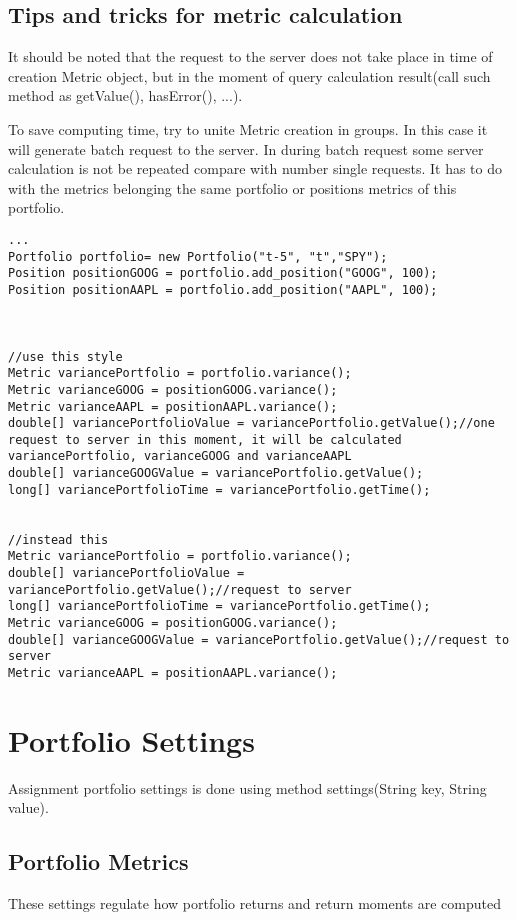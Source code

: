\documentclass[letterpaper]{report}
\begin{document}
\section{Tips and tricks for metric calculation }
It should be noted that the request to the server does not take place in time of creation Metric object, but in the moment of query calculation result(call such method as getValue(), hasError(), ...).

To  save computing time, try to unite Metric creation in groups.
In this case it will generate batch request to the server.
In during batch request some server calculation is  not be repeated compare with number single requests.
It has to do with the metrics belonging the same portfolio
or positions  metrics of this portfolio.

\begin{lstlisting}
...
Portfolio portfolio= new Portfolio("t-5", "t","SPY");
Position positionGOOG = portfolio.add_position("GOOG", 100);
Position positionAAPL = portfolio.add_position("AAPL", 100);



//use this style
Metric variancePortfolio = portfolio.variance();
Metric varianceGOOG = positionGOOG.variance();
Metric varianceAAPL = positionAAPL.variance();
double[] variancePortfolioValue = variancePortfolio.getValue();//one request to server in this moment, it will be calculated variancePortfolio, varianceGOOG and varianceAAPL
double[] varianceGOOGValue = variancePortfolio.getValue();
long[] variancePortfolioTime = variancePortfolio.getTime();


//instead this
Metric variancePortfolio = portfolio.variance();
double[] variancePortfolioValue = variancePortfolio.getValue();//request to server
long[] variancePortfolioTime = variancePortfolio.getTime();
Metric varianceGOOG = positionGOOG.variance();
double[] varianceGOOGValue = variancePortfolio.getValue();//request to server
Metric varianceAAPL = positionAAPL.variance();

\end{lstlisting}


\chapter{Portfolio Settings}
Assignment portfolio settings is done using method settings(String key, String value).
\section{Portfolio Metrics}
These settings regulate how portfolio returns and return moments are computed
\end{document}
